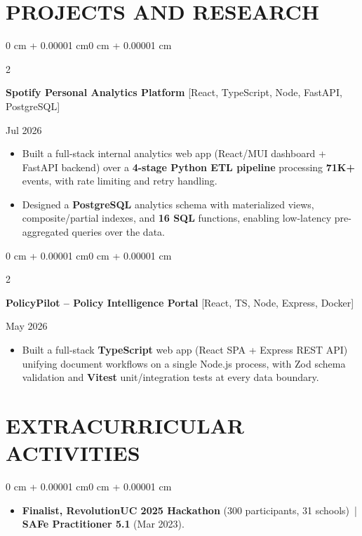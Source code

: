 \documentclass[10pt, letterpaper]{article}
\newenvironment{highlights}{
    \begin{itemize}[
        topsep=0.10 cm,
        parsep=0.06 cm,
        partopsep=0pt,
        itemsep=0.06 cm,
        leftmargin=12pt
    ]
}{
    \end{itemize}
}
\newenvironment{onecolentry}{
    \begin{adjustwidth}{0 cm + 0.00001 cm}{0 cm + 0.00001 cm}
}{
    \end{adjustwidth}
}
\newenvironment{twocolentry}[2][]{
    \onecolentry
    \def\secondColumn{#2}
    \setcolumnwidth{\fill, 4.5 cm}
    \begin{paracol}{2}
}{
    \switchcolumn \raggedleft \secondColumn
    \end{paracol}
    \endonecolentry
}
\begin{document}
\section{PROJECTS AND RESEARCH}
\begin{twocolentry}{Jul 2026}
\textbf{Spotify Personal Analytics Platform} [React, TypeScript, Node, FastAPI, PostgreSQL]
\end{twocolentry}
\begin{highlights}
  \item Built a full-stack internal analytics web app (React/MUI dashboard + FastAPI backend) over a \textbf{4-stage Python ETL pipeline} processing \textbf{71K+} events, with rate limiting and retry handling.
  \item Designed a \textbf{PostgreSQL} analytics schema with materialized views, composite/partial indexes, and \textbf{16 SQL} functions, enabling low-latency pre-aggregated queries over the data.
\end{highlights}

\vspace{0.12 cm}

\begin{twocolentry}{May 2026}
\textbf{PolicyPilot -- Policy Intelligence Portal} [React, TS, Node, Express, Docker]
\end{twocolentry}
\begin{highlights}
  \item Built a full-stack \textbf{TypeScript} web app (React SPA + Express REST API) unifying document workflows on a single Node.js process, with Zod schema validation and \textbf{Vitest} unit/integration tests at every data boundary.
\end{highlights}

\section{EXTRACURRICULAR ACTIVITIES}
\begin{onecolentry}
\begin{highlights}
  \item \textbf{Finalist, RevolutionUC 2025 Hackathon} (300 participants, 31 schools) \,|\, \textbf{SAFe Practitioner 5.1} (Mar 2023).
\end{highlights}
\end{onecolentry}
\end{document}
